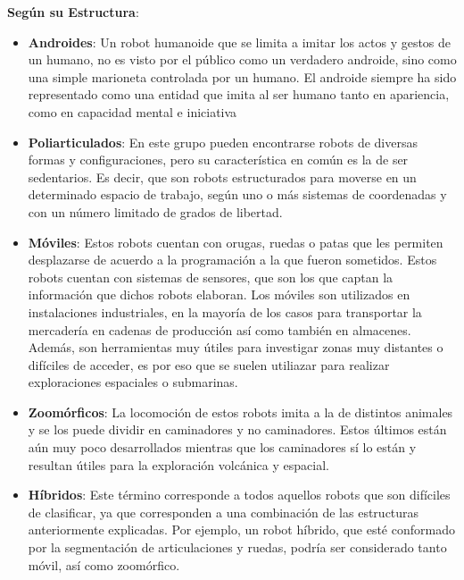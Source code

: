 \textbf{Según su Estructura}:
\begin{itemize}
\item \textbf{Androides}: Un robot humanoide que se limita a imitar los actos y gestos de un humano, no es visto por el público como un verdadero androide, sino como una simple marioneta controlada por un humano. El androide siempre ha sido representado como una entidad que imita al ser humano tanto en apariencia, como en capacidad mental e iniciativa

\item \textbf{Poliarticulados}: En este grupo pueden encontrarse robots de diversas formas y configuraciones, pero su característica en común es la de ser sedentarios. Es decir, que son robots estructurados para moverse en un determinado espacio de trabajo, según uno o más sistemas de coordenadas y con un número limitado de grados de libertad.

\item \textbf{Móviles}: Estos robots cuentan con orugas, ruedas o patas que les permiten desplazarse de acuerdo a la programación a la que fueron sometidos. Estos robots cuentan con sistemas de sensores, que son los que captan la información que dichos robots elaboran. Los móviles son utilizados en instalaciones industriales, en la mayoría de los casos para transportar la mercadería en cadenas de producción así como también en almacenes. Además, son herramientas muy útiles para investigar zonas muy distantes o difíciles de acceder, es por eso que se suelen utiliazar para realizar exploraciones espaciales o submarinas.

\item \textbf{Zoomórficos}: La locomoción de estos robots imita a la de distintos animales y se los puede dividir en caminadores y no caminadores. Estos últimos están aún muy poco desarrollados mientras que los caminadores sí lo están y resultan útiles para la exploración volcánica y espacial.

\item \textbf{Híbridos}: Este término corresponde a todos aquellos robots que son difíciles de clasificar, ya que corresponden a una combinación de las estructuras anteriormente explicadas. Por ejemplo, un robot híbrido, que esté conformado por la segmentación de articulaciones y ruedas, podría ser considerado tanto móvil, así como zoomórfico.

\end{itemize}

